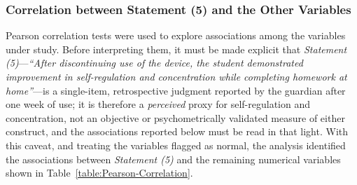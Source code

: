 \subsubsection{Correlation between Statement (5) and the Other Variables}
Pearson correlation tests were used to explore associations among the variables under study. Before interpreting them, it must be made explicit that \textit{Statement (5)}---\textit{``After discontinuing use of the device, the student demonstrated improvement in self-regulation and concentration while completing homework at home''}---is a single-item, retrospective judgment reported by the guardian after one week of use; it is therefore a \emph{perceived} proxy for self-regulation and concentration, not an objective or psychometrically validated measure of either construct, and the associations reported below must be read in that light. With this caveat, and treating the variables flagged as normal, the analysis identified the associations between \textit{Statement (5)} and the remaining numerical variables shown in Table~\ref{table:Pearson-Correlation}.

